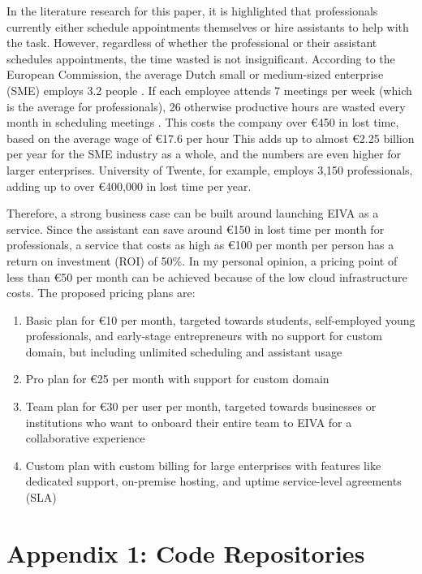 \documentclass{article}
\begin{document}
In the literature research for this paper, it is highlighted that professionals currently either schedule appointments themselves or hire assistants to help with the task. However, regardless of whether the professional or their assistant schedules appointments, the time wasted is not insignificant. According to the European Commission, the average Dutch small or medium-sized enterprise (SME) employs 3.2 people \cite{noauthor_2019_2019}. If each employee attends 7 meetings per week (which is the average for professionals), 26 otherwise productive hours are wasted every month in scheduling meetings \cite{kincaid_electronic_1985}. This costs the company over €450 in lost time, based on the average wage of €17.6 per hour \cite{noauthor_salary_nodate} This adds up to almost €2.25 billion per year for the SME industry as a whole, and the numbers are even higher for larger enterprises. University of Twente, for example, employs 3,150 professionals, adding up to over €400,000 in lost time per year.

Therefore, a strong business case can be built around launching EIVA as a service. Since the assistant can save around €150 in lost time per month for professionals, a service that costs as high as €100 per month per person has a return on investment (ROI) of 50\%. In my personal opinion, a pricing point of less than €50 per month can be achieved because of the low cloud infrastructure costs. The proposed pricing plans are:

\begin{enumerate}
	\item Basic plan for €10 per month, targeted towards students, self-employed young professionals, and early-stage entrepreneurs with no support for custom domain, but including unlimited scheduling and assistant usage
	\item Pro plan for €25 per month with support for custom domain
	\item Team plan for €30 per user per month, targeted towards businesses or institutions who want to onboard their entire team to EIVA for a collaborative experience
	\item Custom plan with custom billing for large enterprises with features like dedicated support, on-premise hosting, and uptime service-level agreements (SLA)
\end{enumerate}

\newpage

\section*{Appendix 1: Code Repositories}
\end{document}
